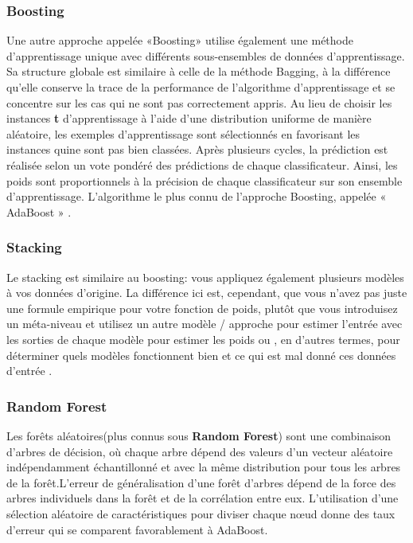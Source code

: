 \documentclass[12pt, french]{report}
\begin{document}
\subsubsection{Boosting}
Une  autre  approche  appelée  «Boosting»  utilise  également une  méthode d'apprentissage  unique  avec  différents  sous-ensembles  de  données  d’apprentissage. Sa structure globale est similaire à celle de la méthode Bagging, à la différence qu’elle  conserve  la  trace  de  la  performance  de  l'algorithme  d'apprentissage  et  se concentre  sur  les  cas  qui  ne  sont  pas  correctement  appris.  Au  lieu  de  choisir  les instances \textbf{t} d’apprentissage à l'aide d'une distribution uniforme de manière aléatoire, les exemples d’apprentissage sont sélectionnés en favorisant les instances quine sont pas  bien  classées.  Après  plusieurs  cycles,  la  prédiction  est  réalisée  selon  un  vote pondéré des prédictions de chaque classificateur. Ainsi, les poids sont proportionnels à la précision de chaque classificateur sur son ensemble d'apprentissage. L’algorithme le plus connu de l’approche Boosting, appelée « AdaBoost » \cite{key27}.
\subsubsection{Stacking}
Le stacking est similaire au boosting: vous appliquez également plusieurs modèles à vos données d'origine. La différence ici est, cependant, que vous n'avez pas juste une formule empirique pour votre fonction de poids, plutôt que vous introduisez un méta-niveau et utilisez un autre modèle / approche pour estimer l'entrée avec les sorties de chaque modèle pour estimer les poids ou , en d'autres termes, pour déterminer quels modèles fonctionnent bien et ce qui est mal donné ces données d'entrée \cite{key28}. 
\subsubsection{Random Forest}
Les forêts aléatoires(plus connus sous \textbf{Random Forest}) sont une combinaison d'arbres  de  décision,  où  chaque  arbre  dépend  des  valeurs  d'un  vecteur  aléatoire indépendamment échantillonné et avec la même distribution pour tous les arbres de la forêt.L'erreur  de  généralisation  d'une  forêt  d'arbres  dépend  de  la  force  des  arbres individuels  dans  la  forêt  et  de  la  corrélation  entre  eux.  L'utilisation d'une  sélection aléatoire  de  caractéristiques  pour  diviser  chaque nœud donne des  taux  d'erreur  qui se comparent favorablement à AdaBoost. \cite{key1}\\
\end{document}

